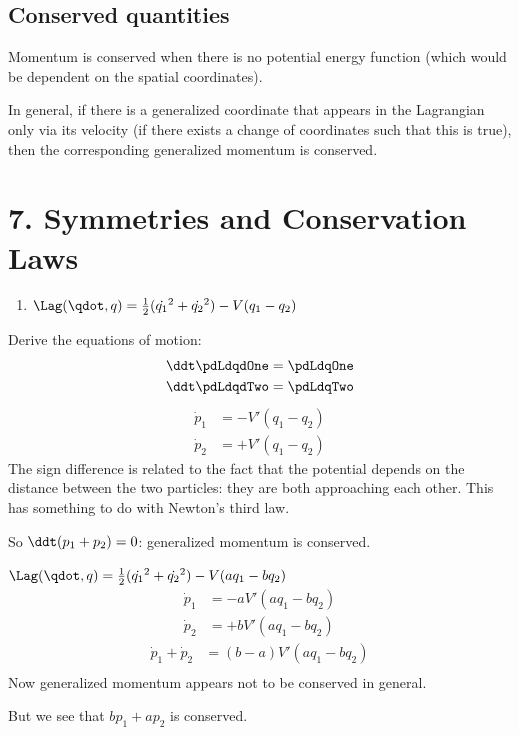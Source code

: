 \subsection*{Conserved quantities}
Momentum is conserved when there is no potential energy function (which would be dependent on the spatial
coordinates).

In general, if there is a generalized coordinate that appears in the Lagrangian only via its velocity (if there
exists a change of coordinates such that this is true), then the corresponding generalized momentum is
conserved.

\section{7.  Symmetries and Conservation Laws}

\begin{enumerate}
\item $\Lag(\qdot, q) = \frac{1}{2}(\dot{q_1}^2 + \dot{q_2}^2) - V(q_1 - q_2)$
\end{enumerate}
Derive the equations of motion:
\begin{align*}
  \ddt \pdLdqdOne &= \pdLdqOne \\
  \ddt \pdLdqdTwo &= \pdLdqTwo \\
\end{align*}
\begin{align*}
  \dot{p}_1        &= -V'(q_1 - q_2) \\
  \dot{p}_2        &= +V'(q_1 - q_2)
\end{align*}
The sign difference is related to the fact that the potential depends on the distance between the two
particles: they are both approaching each other. This has something to do with Newton's third law.

So $\ddt(p_1 + p_2) = 0$: generalized momentum is conserved.

\item $\Lag(\qdot, q) = \frac{1}{2}(\dot{q_1}^2 + \dot{q_2}^2) - V(aq_1 - bq_2)$
\begin{align*}
  \dot{p}_1        &= -aV'(aq_1 - bq_2) \\
  \dot{p}_2        &= +bV'(aq_1 - bq_2)
\end{align*}
\begin{align*}
  \dot{p}_1 + \dot{p}_2 &= (b-a)V'(aq_1 - bq_2) \\
\end{align*}
Now generalized momentum appears not to be conserved in general.

But we see that $bp_1 + ap_2$ is conserved.


